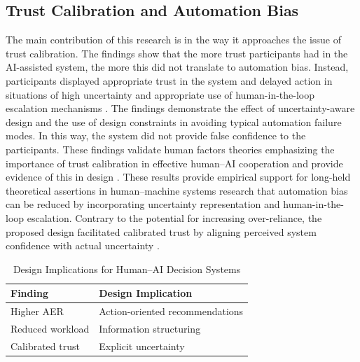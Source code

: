 \documentclass[journal]{IEEEtran}
\theoremstyle{plain}
\theoremstyle{definition}
\begin{document}
\subsection{Trust Calibration and Automation Bias}
The main contribution of this research is in the way it approaches the issue of trust calibration. The findings show that the more trust participants had in the AI-assisted system, the more this did not translate to automation bias. Instead, participants displayed appropriate trust in the system and delayed action in situations of high uncertainty and appropriate use of human-in-the-loop escalation mechanisms \cite{Raji2019AIES,Raji2022CACM,Weidinger2022FAccT}.
The findings demonstrate the effect of uncertainty-aware design and the use of design constraints in avoiding typical automation failure modes. In this way, the system did not provide false confidence to the participants. These findings validate human factors theories emphasizing the importance of trust calibration in effective human--AI cooperation and provide evidence of this in design \cite{Hodgson2013THMS,Bach2024Access}.
These results provide empirical support for long-held theoretical assertions in human--machine systems research that automation bias can be reduced by incorporating uncertainty representation and human-in-the-loop escalation. Contrary to the potential for increasing over-reliance, the proposed design facilitated calibrated trust by aligning perceived system confidence with actual uncertainty \cite{Miller2019XRDS,Weidinger2022FAccT,Lai2023FAccT}.

    \begin{table}[t]
        \caption{Design Implications for Human--AI Decision Systems}
        \label{tab:design_implications}
        \centering
        \begin{tabular}{l l}
            \hline
            Finding & Design Implication \\
            \hline
            Higher AER & Action-oriented recommendations \\
            Reduced workload & Information structuring \\
            Calibrated trust & Explicit uncertainty \\
            \hline
        \end{tabular}
    \end{table}
    
\end{document}
